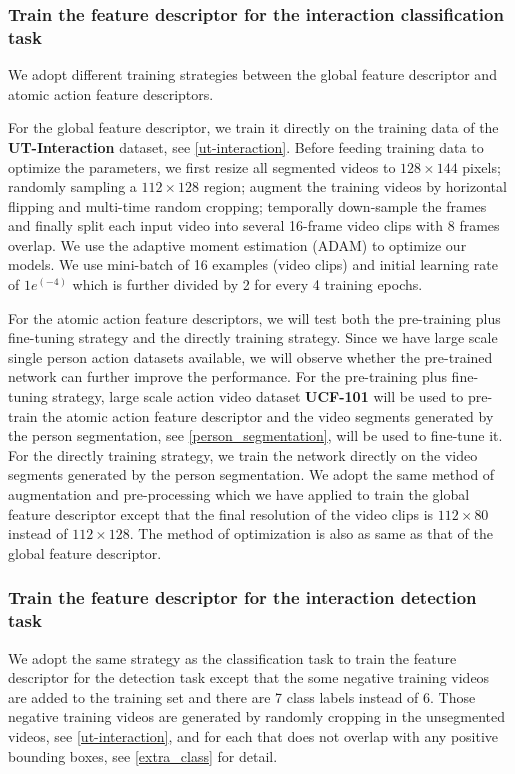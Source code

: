 \subsubsection*{Train the feature descriptor for the interaction classification task } 
We adopt different training strategies between the global feature descriptor and atomic action feature descriptors. 
\par
For the global feature descriptor, we train it directly on the training data of the \textbf{UT-Interaction} dataset, see \ref{ut-interaction}. Before feeding training data to optimize the parameters, we first resize all segmented videos to \(128 \times 144 \) pixels; randomly sampling a \(112 \times 128 \) region; augment the training videos by horizontal flipping and multi-time random cropping; temporally down-sample the frames and finally split each input video into several 16-frame video clips with 8 frames overlap. We use the adaptive moment estimation (ADAM) to optimize our models. We use mini-batch of 16 examples (video clips) and initial learning rate of \(1e^(-4)\) which is further divided by 2 for every 4 training epochs.  
\par
For the atomic action feature descriptors, we will test both the pre-training plus fine-tuning strategy and the directly training strategy. Since we have large scale single person action datasets available, we will observe whether the pre-trained network can further improve the performance. For the pre-training plus fine-tuning strategy, large scale action video dataset \textbf{UCF-101} \cite{ucf101} will be used to pre-train the atomic action feature descriptor and the video segments generated by the person segmentation, see \ref{person_segmentation}, will be used to fine-tune it. For the directly training strategy, we train the network directly on the video segments generated by the person segmentation.  We adopt the same method of augmentation and pre-processing which we have applied to train the global feature descriptor except that the final resolution of the video clips is \(112 \times 80\) instead of \(112 \times 128\).  The method of optimization is also as same as that of the global feature descriptor. 

\subsubsection*{Train the feature descriptor for the interaction detection task }
We adopt the same strategy as the classification task to train the feature descriptor for the detection task except that the some negative training videos are added to the training set and there are 7 class labels instead of 6. Those negative training videos are generated by randomly cropping in the unsegmented videos, see \ref{ut-interaction}, and for each that does not overlap with any positive bounding boxes, see \ref{extra_class} for detail.

